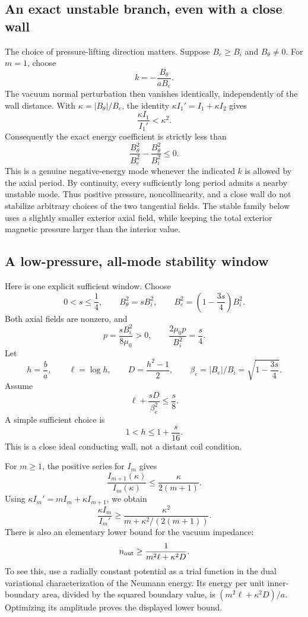 \subsection{An exact unstable branch, even with a close wall}

The choice of pressure-lifting direction matters.  Suppose $B_e\ge B_i$
and $B_\theta\ne0$.  For $m=1$, choose
\[
 k=-\frac{B_\theta}{aB_e}.
\]
The vacuum normal perturbation then vanishes identically, independently
of the wall distance.  With $\kappa=|B_\theta|/B_e$, the identity
$\kappa I_1'=I_1+\kappa I_2$ gives
\[
 \frac{\kappa I_1}{I_1'}<\kappa^2.
\]
Consequently the exact energy coefficient is strictly less than
\[
 \frac{B_\theta^2}{B_e^2}
       -\frac{B_\theta^2}{B_i^2}\le0.
\]
This is a genuine negative-energy mode whenever the indicated $k$ is
allowed by the axial period.  By continuity, every sufficiently long
period admits a nearby unstable mode.  Thus positive pressure,
noncollinearity, and a close wall do not stabilize arbitrary choices
of the two tangential fields.  The stable family below uses a slightly
smaller exterior axial field, while keeping the total exterior magnetic
pressure larger than the interior value.

\subsection{A low-pressure, all-mode stability window}

Here is one explicit sufficient window.  Choose
\[
 0<s\le\frac14,\qquad
 B_\theta^2=sB_i^2,\qquad
 B_e^2=\left(1-\frac{3s}{4}\right)B_i^2.
\]
Both axial fields are nonzero, and
\[
 p=\frac{sB_i^2}{8\mu_0}>0,
 \qquad \frac{2\mu_0p}{B_i^2}=\frac{s}{4}.
\]
Let
\[
 h=\frac ba,\qquad \ell=\log h,
 \qquad D=\frac{h^2-1}{2},
 \qquad \beta_e=|B_e|/B_i=\sqrt{1-\frac{3s}{4}}.
\]
Assume
\[
 \ell+\frac{sD}{\beta_e^2}\le\frac{s}{8}.
\]
A simple sufficient choice is
\[
 1<h\le1+\frac{s}{16}.
\]
This is a close ideal conducting wall, not a distant coil condition.

For $m\ge1$, the positive series for $I_m$ gives
\[
 \frac{I_{m+1}(\kappa)}{I_m(\kappa)}
       \le\frac{\kappa}{2(m+1)}.
\]
Using $\kappa I_m'=mI_m+\kappa I_{m+1}$, we obtain
\[
 \frac{\kappa I_m}{I_m'}
 \ge \frac{\kappa^2}
             {m+\kappa^2/(2(m+1))}.
\]
There is also an elementary lower bound for the vacuum impedance:
\[
 n_{\rm out}\ge\frac{1}{m^2\ell+\kappa^2D}.
\]
To see this, use a radially constant potential as a trial function in
the dual variational characterization of the Neumann energy.  Its
energy per unit inner-boundary area, divided by the squared boundary
value, is $(m^2\ell+\kappa^2D)/a$.  Optimizing its amplitude proves the
displayed lower bound.

